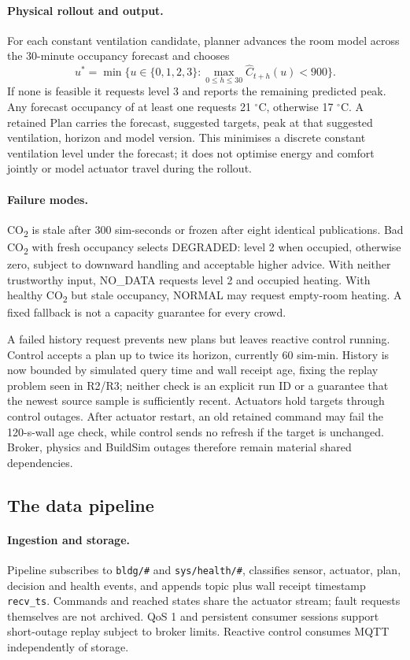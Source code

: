 \documentclass[11pt,a4paper]{article}
\begin{document}
\paragraph{Physical rollout and output.}
For each constant ventilation candidate, planner advances the room model across the 30-minute occupancy forecast and chooses
\begin{equation}
u^*=\min\{u\in\{0,1,2,3\}:\max_{0\leq h\leq30}\widehat C_{t+h}(u)<900\}.
\end{equation}
If none is feasible it requests level 3 and reports the remaining predicted peak. Any forecast occupancy of at least one requests 21 $^\circ$C, otherwise 17 $^\circ$C. A retained Plan carries the forecast, suggested targets, peak at that suggested ventilation, horizon and model version. This minimises a discrete constant ventilation level under the forecast; it does not optimise energy and comfort jointly or model actuator travel during the rollout.

\paragraph{Failure modes.}
CO\textsubscript{2} is stale after 300 sim-seconds or frozen after eight identical publications. Bad CO\textsubscript{2} with fresh occupancy selects DEGRADED: level 2 when occupied, otherwise zero, subject to downward handling and acceptable higher advice. With neither trustworthy input, NO\_DATA requests level 2 and occupied heating. With healthy CO\textsubscript{2} but stale occupancy, NORMAL may request empty-room heating. A fixed fallback is not a capacity guarantee for every crowd.

A failed history request prevents new plans but leaves reactive control running. Control accepts a plan up to twice its horizon, currently 60 sim-min. History is now bounded by simulated query time and wall receipt age, fixing the replay problem seen in R2/R3; neither check is an explicit run ID or a guarantee that the newest source sample is sufficiently recent. Actuators hold targets through control outages. After actuator restart, an old retained command may fail the 120-s-wall age check, while control sends no refresh if the target is unchanged. Broker, physics and BuildSim outages therefore remain material shared dependencies.

\subsection{The data pipeline}
\paragraph{Ingestion and storage.}
Pipeline subscribes to \texttt{bldg/\#} and \texttt{sys/health/\#}, classifies sensor, actuator, plan, decision and health events, and appends topic plus wall receipt timestamp \texttt{recv\_ts}. Commands and reached states share the actuator stream; fault requests themselves are not archived. QoS 1 and persistent consumer sessions support short-outage replay subject to broker limits. Reactive control consumes MQTT independently of storage.
\end{document}
